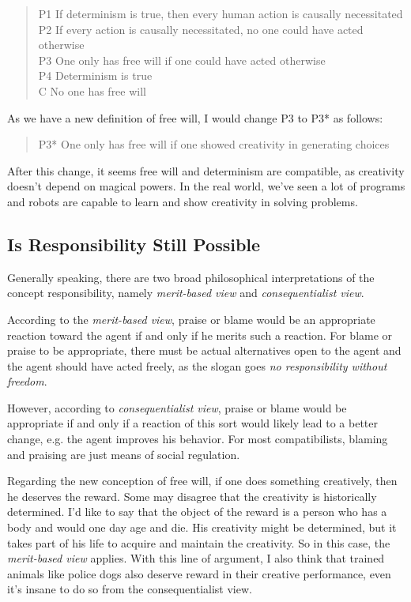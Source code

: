 \begin{quote}
 P1 If determinism is true, then every human action is causally necessitated \\
 P2 If every action is causally necessitated, no one could have acted otherwise \\
 P3 One only has free will if one could have acted otherwise \\
 P4 Determinism is true \\
 C No one has free will
\end{quote}

As we have a new definition of free will, I would change P3 to P3* as follows:

\begin{quote}
  P3* One only has free will if one showed creativity in generating choices
\end{quote}

After this change, it seems free will and determinism are compatible, as creativity doesn't depend on magical powers. In the real world, we've seen a lot of programs and robots are capable to learn and show creativity in solving problems.

\subsection{Is Responsibility Still Possible}

Generally speaking, there are two broad philosophical interpretations of the concept responsibility, namely \emph{merit-based view} and \emph{consequentialist view}\cite{sep-moral-responsibility}.

According to the \emph{merit-based view}, praise or blame would be an appropriate reaction toward the agent if and only if he merits such a reaction. For blame or praise to be appropriate, there must be actual alternatives open to the agent and the agent should have acted freely, as the slogan goes \emph{no responsibility without freedom}.

However, according to \emph{consequentialist view}, praise or blame would be appropriate if and only if a reaction of this sort would likely lead to a better change, e.g. the agent improves his behavior. For most compatibilists, blaming and praising are just means of social regulation.

Regarding the new conception of free will, if one does something creatively, then he deserves the reward. Some may disagree that the creativity is historically determined. I'd like to say that the object of the reward is a person who has a body and would one day age and die. His creativity might be determined, but it takes part of his life to acquire and maintain the creativity. So in this case, the \emph{merit-based view} applies. With this line of argument, I also think that trained animals like police dogs also deserve reward in their creative performance, even it's insane to do so from the consequentialist view.

